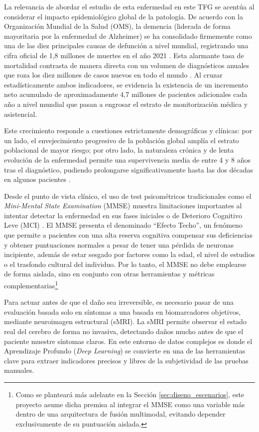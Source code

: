 \documentclass[12pt, oneside, english, spanish]{book}
\begin{document}
La relevancia de abordar el estudio de esta enfermedad en este TFG se acentúa al considerar el impacto epidemiológico global de la patología. De acuerdo con la Organización Mundial de la Salud (OMS), la demencia (liderada de forma mayoritaria por la enfermedad de Alzheimer) se ha consolidado firmemente como una de las diez principales causas de defunción a nivel mundial, registrando una cifra oficial de 1,8 millones de muertes en el año 2021 \cite{who2024top10}. Esta alarmante tasa de mortalidad contrasta de manera directa con un volumen de diagnósticos anuales que roza los diez millones de casos nuevos en todo el mundo \cite{who2023dementia}. Al cruzar estadísticamente ambos indicadores, se evidencia la existencia de un incremento neto acumulado de aproximadamente 4,7 millones de pacientes adicionales cada año a nivel mundial que pasan a engrosar el estrato de monitorización médica y asistencial.

Este crecimiento responde a cuestiones estrictamente demográficas y clínicas: por un lado, el envejecimiento progresivo de la población global amplía el estrato poblacional de mayor riesgo; por otro lado, la naturaleza crónica y de lenta evolución de la enfermedad permite una supervivencia media de entre 4 y 8 años tras el diagnóstico, pudiendo prolongarse significativamente hasta las dos décadas en algunos pacientes \cite{alz2026stages}.

Desde el punto de vista clínico, el uso de test psicométricos tradicionales como el \textit{Mini-Mental State Examination} (MMSE) \cite{folstein1975mini} muestra limitaciones importantes al intentar detectar la enfermedad en sus fases iniciales o de Deterioro Cognitivo Leve (MCI) \cite{tombaugh1992mini}. El MMSE presenta el denominado ``Efecto Techo'', un fenómeno que permite a pacientes con una alta reserva cognitiva compensar sus deficiencias y obtener puntuaciones normales a pesar de tener una pérdida de neuronas incipiente, además de estar sesgado por factores como la edad, el nivel de estudios o el trasfondo cultural del individuo. Por lo tanto, el MMSE no debe emplearse de forma aislada, sino en conjunto con otras herramientas y métricas complementarias\footnote{Como se planteará más adelante en la Sección \ref{sec:diseno_escenarios}, este proyecto asume dicha premisa al integrar el MMSE como una variable más dentro de una arquitectura de fusión multimodal, evitando depender exclusivamente de su puntuación aislada.}

Para actuar antes de que el daño sea irreversible, es necesario pasar de una evaluación basada solo en síntomas a una basada en biomarcadores objetivos, mediante neuroimagen estructural (sMRI). La sMRI permite observar el estado real del cerebro de forma no invasiva, detectando daños mucho antes de que el paciente muestre síntomas claros. En este entorno de datos complejos es donde el Aprendizaje Profundo (\textit{Deep Learning}) se convierte en una de las herramientas clave para extraer indicadores precisos y libres de la subjetividad de las pruebas manuales.
\end{document}

